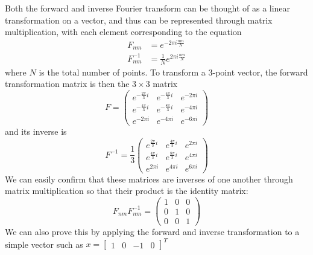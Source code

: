 \message{ !name(austin_report.tex)}\documentclass[11pt, letterpage]{article}
\begin{document}
Both the forward and inverse Fourier transform can be thought of as a linear
transformation on a vector, and thus can be represented through matrix
multiplication, with each element corresponding to the equation
\begin{equation}
  \begin{aligned}
    F_{nm} &= e^{- 2 \pi i \frac{nm}{N}} \\
    F_{nm}^{-1} &= \frac{1}{N} e^{2 \pi i \frac{nm}{N}}
  \end{aligned}
  \label{fft_mat_el}
\end{equation}
where $N$ is the total number of points. To transform a $3$-point vector, the
forward transformation matrix is then the $3 \times 3$ matrix
\begin{equation}
  F =
  \begin{pmatrix}
    e^{- \frac{2 \pi}{3} i} & e^{- \frac{4 \pi}{3} i} & e^{- 2 \pi i} \\
    e^{- \frac{4 \pi}{3} i} & e^{- \frac{8 \pi}{3} i} & e^{- 4 \pi i} \\
    e^{- 2 \pi i} & e^{- 4 \pi i} & e^{- 6 \pi i}
  \end{pmatrix}
\end{equation}
and its inverse is
\begin{equation}
  F^{-1} = \frac{1}{3}
  \begin{pmatrix}
    e^{\frac{2 \pi}{3} i} & e^{\frac{4 \pi}{3} i} & e^{2 \pi i} \\
    e^{\frac{4 \pi}{3} i} & e^{\frac{8 \pi}{3} i} & e^{4 \pi i} \\
    e^{2 \pi i} & e^{4 \pi i} & e^{6 \pi i}
  \end{pmatrix}
\end{equation}
We can easily confirm that these matrices are inverses of one another through
matrix multiplication so that their product is the identity matrix:
\begin{equation}
  F_{nm}F_{nm}^{-1}
  = \begin{pmatrix}
    1 & 0 & 0 \\
    0 & 1 & 0 \\
    0 & 0 & 1
  \end{pmatrix}
\end{equation}
We can also prove this by applying the forward and inverse transformation to a
simple vector such as $x = \begin{bmatrix} 1 & 0 & -1 & 0 \end{bmatrix}^T$
\end{document}
